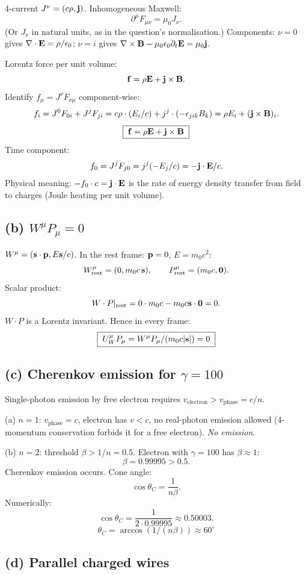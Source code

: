 \documentclass[11pt]{article}
\begin{document}
4-current $J^\nu = (c\rho,\vb j)$. Inhomogeneous Maxwell:
\[ \partial^\mu F_{\mu\nu} = \mu_0 J_\nu. \]
(Or $J_\nu$ in natural units, as in the question's normalisation.) Components: $\nu=0$ gives $\nabla\cdot\vb E = \rho/\epsilon_0$; $\nu=i$ gives $\nabla\times\vb B - \mu_0\epsilon_0\partial_t\vb E = \mu_0\vb j$.

Lorentz force per unit volume:
\[ \vb f = \rho\vb E + \vb j\times\vb B. \]
Identify $f_\mu = J^\nu F_{\nu\mu}$ component-wise:
\[ f_i = J^0 F_{0i} + J^j F_{ji} = c\rho\cdot(E_i/c) + j^j\cdot(-\epsilon_{jik}B_k) = \rho E_i + (\vb j\times\vb B)_i. \]
\[ \boxed{\;\vb f = \rho\vb E + \vb j\times\vb B\;} \]
Time component:
\[ f_0 = J^j F_{j0} = j^j(-E_j/c) = -\vb j\cdot\vb E/c. \]
Physical meaning: $-f_0\cdot c = \vb j\cdot\vb E$ is the rate of energy density transfer from field to charges (Joule heating per unit volume).

\subsection*{(b) $W^\mu P_\mu = 0$}

$W^\mu = (\vb s\cdot\vb p, E\vb s/c)$. In the rest frame: $\vb p = 0$, $E = m_0 c^2$:
\[ W^\mu_\text{rest} = (0, m_0 c\,\vb s),\qquad P^\mu_\text{rest} = (m_0 c, \vb 0). \]
Scalar product:
\[ W\cdot P|_\text{rest} = 0\cdot m_0 c - m_0 c\vb s\cdot\vb 0 = 0. \]
$W\cdot P$ is a Lorentz invariant. Hence in every frame:
\[ \boxed{\;U^\mu_W P_\mu = W^\mu P_\mu/(m_0 c|\vb s|) = 0\;} \]

\subsection*{(c) Cherenkov emission for $\gamma=100$}

Single-photon emission by free electron requires $v_\text{electron} > v_\text{phase} = c/n$.

(a) $n=1$: $v_\text{phase} = c$, electron has $v<c$, no real-photon emission allowed (4-momentum conservation forbids it for a free electron). \emph{No emission}.

(b) $n=2$: threshold $\beta > 1/n = 0.5$. Electron with $\gamma=100$ has $\beta\approx 1$:
\[ \beta = 0.99995 > 0.5. \]
Cherenkov emission occurs. Cone angle:
\[ \cos\theta_C = \frac{1}{n\beta}. \]
Numerically:
\[ \cos\theta_C = \frac{1}{2\cdot 0.99995} \approx 0.50003. \]
\[ \boxed{\;\theta_C = \arccos(1/(n\beta)) \approx 60^\circ\;} \]

\subsection*{(d) Parallel charged wires}
\end{document}
